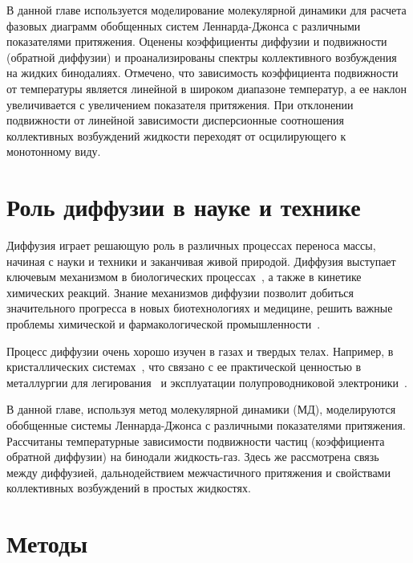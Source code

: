 В данной главе используется моделирование молекулярной динамики для расчета фазовых диаграмм обобщенных систем Леннарда-Джонса с различными показателями притяжения.
Оценены коэффициенты диффузии и подвижности (обратной диффузии) и проанализированы спектры коллективного возбуждения на жидких бинодалиях. 
Отмечено, что зависимость коэффициента подвижности от температуры является линейной в широком диапазоне температур, а ее наклон увеличивается с увеличением показателя притяжения.
При отклонении подвижности от линейной зависимости дисперсионные соотношения коллективных возбуждений жидкости переходят от осцилирующего к монотонному виду.

\section{Роль диффузии в науке и технике}
\label{MACR-SecIntroduction}

Диффузия играет решающую роль в различных процессах переноса массы, начиная с науки и техники и заканчивая живой природой.
Диффузия выступает ключевым механизмом в биологических процессах~\cite{10.1016/j.bbagen.2013.09.037, 10.1038/s41598-018-22643-9}, а также в кинетике химических реакций.
Знание механизмов диффузии позволит добиться значительного прогресса в новых биотехнологиях и медицине, решить важные проблемы химической и фармакологической промышленности~\cite{10.1002/3527602836}.

Процесс диффузии очень хорошо изучен в газах и твердых телах.
Например, в кристаллических системах~\cite{10.1016/0079-6816(95)00039-2}, что связано с ее практической ценностью в металлургии для легирования~\cite{10.1016/s0924-0136(96)02826-9, 10.1016/j.actamat.2015.10.010, 10.1134/s1063783411110308} и эксплуатации полупроводниковой электроники~\cite{10.1103/physrevlett.84.4220, 10.1016/j.physrep.2009.10.003}.

В данной главе, используя метод молекулярной динамики (МД), моделируются обобщенные системы Леннарда-Джонса с различными показателями притяжения.
Рассчитаны температурные зависимости подвижности частиц (коэффициента обратной диффузии) на бинодали жидкость-газ. 
Здесь же рассмотрена связь между диффузией, дальнодействием межчастичного притяжения и свойствами коллективных возбуждений в простых жидкостях.

\section{Методы}
\label{MACR-SecMethods}

